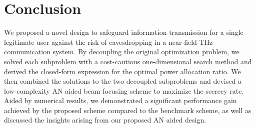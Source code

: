 \documentclass[10pt,technote]{IEEEtran}
\newcommand{\1}{\mathbbm{1}}
\begin{document}
\section{Conclusion}\label{Sec:Conclusion}

We proposed a novel design to safeguard information transmission for a single legitimate user against the risk of eavesdropping in a near-field THz communication system. By decoupling the original optimization problem, we solved each subproblem with a cost-cautious one-dimensional search method and derived the closed-form expression for the optimal power allocation ratio. We then combined the solutions to the two decoupled subproblems and devised a low-complexity AN aided beam focusing scheme to maximize the secrecy rate. Aided by numerical results, we demonstrated a significant performance gain achieved by the proposed scheme compared to the benchmark scheme, as well as discussed the insights arising from our proposed AN aided design.


\end{document}
